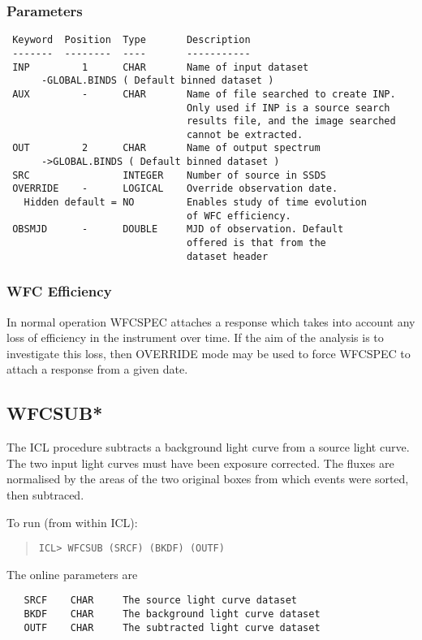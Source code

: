 \documentclass{book}
\renewcommand{\_}{{\tt\char'137}}     %
\begin{document}
\subsubsection{Parameters}
\begin{verbatim}
 Keyword  Position  Type       Description
 -------  --------  ----       -----------
 INP         1      CHAR       Name of input dataset
      -GLOBAL.BINDS ( Default binned dataset )
 AUX         -      CHAR       Name of file searched to create INP.
                               Only used if INP is a source search
                               results file, and the image searched
                               cannot be extracted.
 OUT         2      CHAR       Name of output spectrum
      ->GLOBAL.BINDS ( Default binned dataset )
 SRC                INTEGER    Number of source in SSDS
 OVERRIDE    -      LOGICAL    Override observation date.
   Hidden default = NO         Enables study of time evolution
                               of WFC efficiency.
 OBSMJD      -      DOUBLE     MJD of observation. Default
                               offered is that from the
                               dataset header
\end{verbatim}\subsubsection{WFC Efficiency}
In normal operation WFCSPEC attaches a response which takes into
account any loss of efficiency in the instrument over time. If
the aim of the analysis is to investigate this loss, then OVERRIDE
mode may be used to force WFCSPEC to attach a response from a
given date.

\subsection{WFCSUB*}
The ICL procedure subtracts a background light curve from a source light
curve. The two input light curves must have been exposure corrected. The
fluxes are normalised by the areas of the two original boxes from which
events were sorted, then subtraced.

To run (from within ICL):
\begin{quote}\begin{verbatim}
ICL> WFCSUB (SRCF) (BKDF) (OUTF)
\end{verbatim}\end{quote}
The online parameters are
\begin{verbatim}
   SRCF    CHAR     The source light curve dataset
   BKDF    CHAR     The background light curve dataset
   OUTF    CHAR     The subtracted light curve dataset
\end{verbatim}
\end{document}
